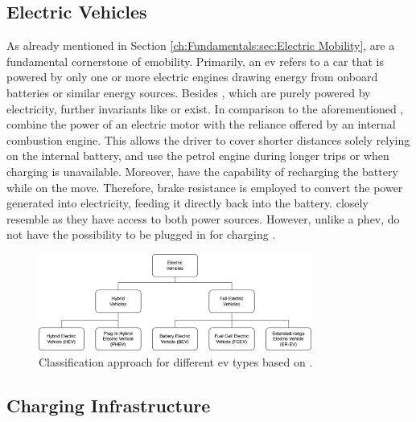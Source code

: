 \subsection{Electric Vehicles}
\label{ch:Fundamentals:sec:Electric Mobility:Electric Vehicles}

As already mentioned in Section \ref{ch:Fundamentals:sec:Electric Mobility},  are a fundamental cornerstone of \acrshort{emobility}. Primarily, an \acrshort{ev} refers to a car that is powered by only one or more electric engines drawing energy from onboard batteries or similar energy sources.
Besides , which are purely powered by electricity, further invariants like  or  exist. In comparison to the aforementioned ,  combine the power of an electric motor with the reliance offered by an internal combustion engine.
This allows the driver to cover shorter distances solely relying on the internal battery, and use the petrol engine during longer trips or when charging is unavailable. Moreover,  have the capability of recharging the battery while on the move.
Therefore, brake resistance is employed to convert the power generated into electricity, feeding it directly back into the battery.
 closely resemble  as they have access to both power sources. However, unlike a \acrshort{phev},  do not have the possibility to be plugged in for charging \cite{kathiresh_e-mobility_2022}.

\begin{figure}[h]
    \centering
    \includegraphics[width=0.8\textwidth,keepaspectratio]{resources/images/main/1_fundamentals/ElectricVehicleTypes.png}
    \caption{Classification approach for different \acrshort{ev} types based on \cite{acharige_review_2023}.}
    \label{fig:ev-classification}
\end{figure}

\subsection{Charging Infrastructure}
\label{ch:Fundamentals:sec:Electric Mobility:ssec:Charging Infrastructure}

